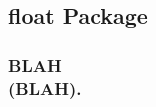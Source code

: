 \documentclass[class=book , crop=false]{standalone}
\title{}  %
\begin{document}



\subsection{float Package}
\medskip 
\subsubsection{\Large BLAH \\\small(BLAH).}
\end{document}
